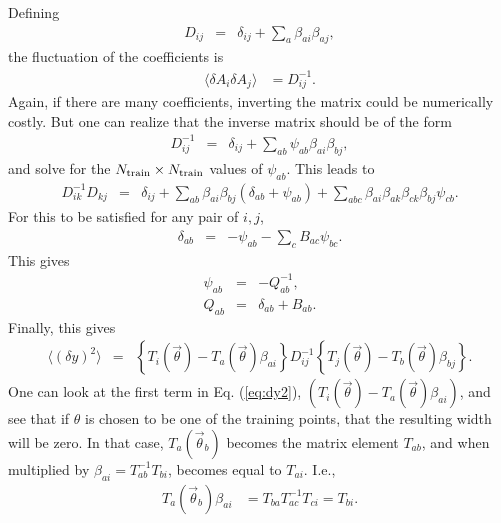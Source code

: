 \documentclass[UserManual.tex]{subfiles}
\begin{document}
Defining
\begin{eqnarray}
D_{ij}&=&\delta_{ij}+\sum_a\beta_{ai}\beta_{aj},
\end{eqnarray}
the fluctuation of the coefficients is
\begin{eqnarray}
\langle\delta A_i\delta A_j\rangle&=D^{-1}_{ij}.
\end{eqnarray}
Again, if there are many coefficients, inverting the matrix could be numerically costly. But one can realize that the inverse matrix should be of the form
\begin{eqnarray}\label{eq:DinvDef}
D^{-1}_{ij}&=&\delta_{ij}+\sum_{ab}\psi_{ab}\beta_{ai}\beta_{bj},
\end{eqnarray}
and solve for the $N_{\rm train}\times N_{\rm train}$ values of $\psi_{ab}$. This leads to
\begin{eqnarray}
D^{-1}_{ik}D_{kj}&=&
\delta_{ij}+\sum_{ab}\beta_{ai}\beta_{bj}(\delta_{ab}+\psi_{ab})+\sum_{abc}\beta_{ai}\beta_{ak}\beta_{ck}\beta_{bj}\psi_{cb}.
\end{eqnarray}
For this to be satisfied for any pair of $i,j$,
\begin{eqnarray}
\delta_{ab}&=&-\psi_{ab}-\sum_cB_{ac}\psi_{bc}.
\end{eqnarray}
This gives
\begin{eqnarray}
\psi_{ab}&=&-Q^{-1}_{ab},\\
\nonumber
Q_{ab}&=&\delta_{ab}+B_{ab}.
\end{eqnarray}
Finally, this gives
\begin{eqnarray}\label{eq:dy2}
\langle(\delta y)^2\rangle&=&
\left\{T_i(\vec{\theta})-T_{a}(\vec{\theta})\beta_{ai}\right\}D^{-1}_{ij}
\left\{T_j(\vec{\theta})-T_b(\vec{\theta})\beta_{bj}\right\}.
\end{eqnarray}
One can look at the first term in Eq. (\ref{eq:dy2}), $(T_i(\vec{\theta})-T_{a}(\vec{\theta})\beta_{ai})$, and see that if $\theta$ is chosen to be one of the training points, that the resulting width will be zero. In that case, $T_{a}(\vec{\theta}_b)$ becomes the matrix element $T_{ab}$, and when multiplied by $\beta_{ai}=T^{-1}_{ab}T_{bi}$, becomes equal to $T_{ai}$. I.e.,
\begin{eqnarray}
T_a(\vec{\theta}_b)\beta_{ai}&=T_{ba}T^{-1}_{ac}T_{ci}=T_{bi}.
\end{eqnarray}
\end{document}
